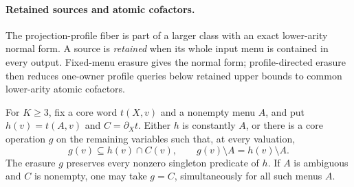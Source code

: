 \paragraph{Retained sources and atomic cofactors.}
The projection-profile fiber is part of a larger class with an exact
lower-arity normal form. A source is \emph{retained} when its whole input
menu is contained in every output. Fixed-menu erasure gives the normal form;
profile-directed erasure then reduces one-owner profile queries below
retained upper bounds to common lower-arity atomic cofactors.

\begin{lemma}\label{core:lem:winner-erasure}
For $K\geq3$, fix a core word $t(X,v)$ and a nonempty menu $A$, and put
$h(v)=t(A,v)$ and $C=\partial_Xt$.
Either $h$ is constantly $A$, or there is a core operation $g$ on
the remaining variables such that, at every valuation,
\[
 g(v)\subseteq h(v)\cap C(v),\qquad
 g(v)\setminus A=h(v)\setminus A.
\]
The erasure $g$ preserves every nonzero singleton predicate of $h$.
If $A$ is ambiguous and $C$ is nonempty, one may take $g=C$,
simultaneously for all such menus $A$.
\end{lemma}
